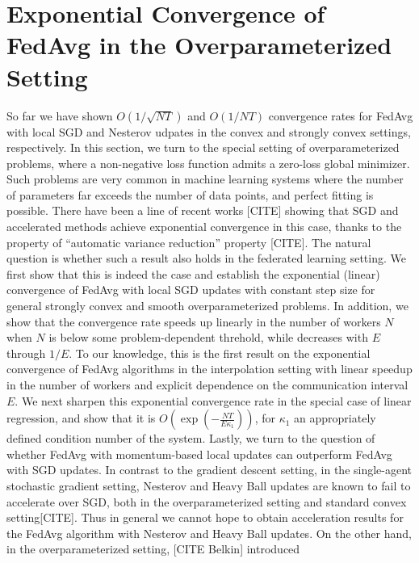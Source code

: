 


\section{Exponential Convergence of FedAvg in the Overparameterized Setting}

So far we have shown $O(1/\sqrt{NT})$ and $O(1/NT)$ convergence
rates for FedAvg with local SGD and Nesterov udpates in the convex
and strongly convex settings, respectively. In this section, we turn
to the special setting of overparameterized problems, where a non-negative
loss function admits a zero-loss global minimizer. Such problems are
very common in machine learning systems where the number of parameters
far exceeds the number of data points, and perfect fitting is possible.
There have been a line of recent works {[}CITE{]} showing that SGD
and accelerated methods achieve exponential convergence in this case,
thanks to the property of ``automatic variance reduction'' property
{[}CITE{]}. The natural question is whether such a result also holds
in the federated learning setting. We first show that this is indeed
the case and establish the exponential (linear) convergence of FedAvg
with local SGD updates with constant step size for general strongly
convex and smooth overparameterized problems. In addition, we show
that the convergence rate speeds up linearly in the number of workers
$N$ when $N$ is below some problem-dependent threhold, while decreases
with $E$ through $1/E$. To our knowledge, this is the first result
on the exponential convergence of FedAvg algorithms in the interpolation
setting with linear speedup in the number of workers and explicit
dependence on the communication interval $E$. We next sharpen this
exponential convergence rate in the special case of linear regression,
and show that it is $O(\exp(-\frac{NT}{E\kappa_{1}}))$, for $\kappa_{1}$
an appropriately defined condition number of the system. Lastly, we
turn to the question of whether FedAvg with momentum-based local updates
can outperform FedAvg with SGD updates. In contrast to the gradient
descent setting, in the single-agent stochastic gradient setting,
Nesterov and Heavy Ball updates are known to fail to accelerate over
SGD, both in the overparameterized setting and standard convex setting{[}CITE{]}.
Thus in general we cannot hope to obtain acceleration results for
the FedAvg algorithm with Nesterov and Heavy Ball updates. On the
other hand, in the overparameterized setting, {[}CITE Belkin{]} introduced

